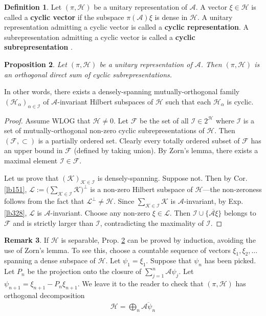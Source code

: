 \documentclass[12pt,b5paper,notitlepage]{article}
\theoremstyle{definition}
\newtheorem{df}{Definition}[subsection]
\newtheorem{rem}[df]{Remark}
\theoremstyle{plain}
\newtheorem{pp}[df]{Proposition}
\newcommand{\mc}{\mathcal}
\newcommand{\ovl}{\overline}
\newcommand{\scr}{\mathscr}
\newcommand{\MH}{\mathcal H}
\newcommand{\MK}{\mathcal K}
\newcommand{\SI}{\mathscr I}
\newcommand{\SA}{\mathscr A}
\newcommand{\SF}{\mathscr F}
\numberwithin{equation}{section}
\begin{document}
\begin{df}
Let $(\pi,\MH)$ be a unitary representation of $\SA$. A vector $\xi\in \MH$ is called a \textbf{cyclic vector}  if the subspace $\pi(\scr A)\xi$ is dense in $\MH$. A unitary representation admitting a cyclic vector is called a \textbf{cyclic representation}.  A subrepresentation admitting a cyclic vector is called a \textbf{cyclic subrepresentation} .
\end{df}


\begin{pp}\label{lb329}
Let $(\pi,\MH)$ be a unitary representation of $\SA$. Then $(\pi,\MH)$ is an orthogonal direct sum of cyclic subrepresentations. 
\end{pp}


In other words, there exists a densely-spanning mutually-orthogonal family $(\MH_\alpha)_{\alpha\in\SI}$ of $\SA$-invariant Hilbert subspaces of $\MH$ such that each $\MH_\alpha$ is cyclic.

\begin{proof}
Assume WLOG that $\MH\neq0$. Let $\SF$ be the set of all $\SI\in 2^\MH$ where $\SI$ is a set of mutually-orthogonal non-zero cyclic subrepresentations of $\MH$. Then $(\SF,\subset)$ is a partially ordered set. Clearly every totally ordered subset of $\SF$ has an upper bound in $\SF$ (defined by taking union). By Zorn's lemma, there exists a maximal element $\SI\in\SF$. 

Let us prove that $(\MK)_{\MK\in\SI}$ is densely-spanning. Suppose not. Then by Cor. \ref{lb151}, $\mc L:=\big(\sum_{\MK\in\SI}\MK\big)^\perp$ is a non-zero Hilbert subspace of $\MH$---the non-zeroness follows from the fact that $\mc L^\perp\neq\MH$. Since $\sum_{\MK\in\SI}\MK$ is $\SA$-invariant, by Exp. \ref{lb328}, $\mc L$ is $\SA$-invariant. Choose any non-zero $\xi\in\mc L$. Then $\SI\cup\{\ovl{\SA\xi}\}$ belongs to $\SF$ and is strictly larger than $\SI$, contradicting the maximality of $\SI$.
\end{proof}


\begin{rem}
If $\MH$ is separable, Prop. \ref{lb329} can be proved by induction, avoiding the use of Zorn’s lemma. To see this, choose a countable sequence of vectors $\xi_1,\xi_2,\dots$ spanning a dense subspace of $\MH$. Let $\psi_1=\xi_1$. Suppose that $\psi_n$ has been picked. Let $P_n$ be the projection onto the closure of $\sum_{j=1}^n\SA\psi_j$. Let $\psi_{n+1}=\xi_{n+1}-P_n\xi_{n+1}$. We leave it to the reader to check that $(\pi,\MH)$ has orthogonal decomposition
\begin{align*}
\MH=\bigoplus_n \ovl{\SA\psi_n}
\end{align*}
\end{rem}
\end{document}
